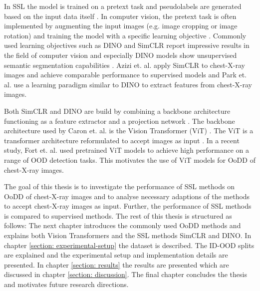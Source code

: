 In SSL the model is trained on a pretext task and pseudolabels are generated based on the input data itself \citep{Jaiswal2021}.
In computer vision, the pretext task is often implemented by augmenting the input images (e.g. image cropping or image rotation) and training the model with a specific learning objective \citep{Jaiswal2020}.
Commonly used learning objectives such as DINO \citep{Caron2021} and SimCLR \citep{Chen2020} report impressive results in the field of computer vision and especially DINO models show unsupervised semantic segmentation capabilities \citep{Caron2021}.
Azizi et. al. \citep{Azizi2021} apply SimCLR to chest-X-ray images and achieve comparable performance to supervised models and Park et. al. \citep{Park2022} use a learning paradigm similar to DINO to extract features from chest-X-ray images.
\par
Both SimCLR and DINO are build by combining a backbone architecture functioning as a feature extractor and a projection network \citep{Caron2021,Chen2020}. 
The backbone architecture used by Caron et. al. is the Vision Transformer (ViT) \citep{Caron2021}.
The ViT is a transformer architecture \citep{Vaswani2017} reformulated to accept images as input \citep{Dosovitskiy2020}.
In a recent study, Fort et. al. \citep{Fort2021} used pretrained ViT models to achieve high performance on a range of OOD detection tasks.
This motivates the use of ViT models for OoDD of chest-X-ray images.
\par
The goal of this thesis is to investigate the performance of SSL methods on OoDD of chest-X-ray images and to analyse necessary adaptions of the methods to accept chest-X-ray images as input.
Further, the performance of SSL methods is compared to supervised methods.
The rest of this thesis is structured as follows: The next chapter introduces the commonly used OoDD methods and explains both Vision Transformers and the SSL methods SimCLR and DINO.
In chapter \ref{section: experimental-setup} the dataset is described.
The ID-OOD splits are explained and the experimental setup and implementation details are presented.
In chapter \ref{section: results} the results are presented which are discussed in chapter \ref{section: discussion}.
The final chapter concludes the thesis and motivates future research directions.
